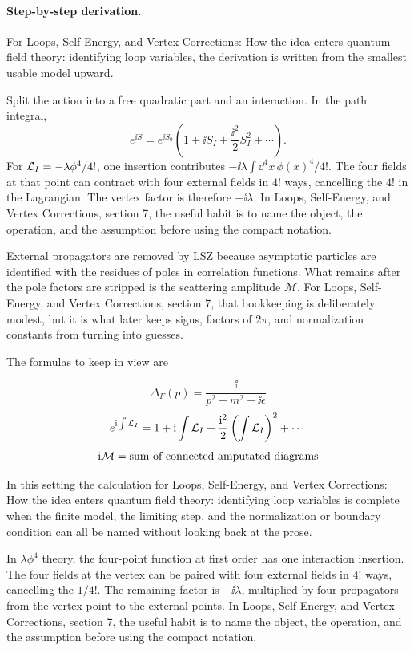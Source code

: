 \paragraph{Step-by-step derivation.}

For Loops, Self-Energy, and Vertex Corrections: How the idea enters quantum field theory: identifying loop variables, the derivation is written from the smallest usable model upward.

Split the action into a free quadratic part and an interaction.  In the path integral,
\[
  e^{\ii S}=e^{\ii S_0}\left(1+\ii S_I+\frac{\ii^2}{2}S_I^2+\cdots\right).
\]
For \(\mathcal L_I=-\lambda\phi^4/4!\), one insertion contributes \(-\ii\lambda\int\dd^4x\,\phi(x)^4/4!\).  The four fields at that point can contract with four external fields in \(4!\) ways, cancelling the \(4!\) in the Lagrangian.  The vertex factor is therefore \(-\ii\lambda\).  In Loops, Self-Energy, and Vertex Corrections, section 7, the useful habit is to name the object, the operation, and the assumption before using the compact notation.

External propagators are removed by LSZ because asymptotic particles are identified with the residues of poles in correlation functions.  What remains after the pole factors are stripped is the scattering amplitude \(\mathcal M\).  For Loops, Self-Energy, and Vertex Corrections, section 7, that bookkeeping is deliberately modest, but it is what later keeps signs, factors of \(2\pi\), and normalization constants from turning into guesses.

The formulas to keep in view are

\[
  \Delta_F(p)=\frac{\ii}{p^2-m^2+\ii\epsilon}
\]
\[
  e^{\mathrm i\int\mathcal L_I}=1+\mathrm i\int\mathcal L_I+\frac{\mathrm i^2}{2}\left(\int\mathcal L_I\right)^2+\cdots
\]
\[
  \mathrm i\mathcal M=\hbox{sum of connected amputated diagrams}
\]

In this setting the calculation for Loops, Self-Energy, and Vertex Corrections: How the idea enters quantum field theory: identifying loop variables is complete when the finite model, the limiting step, and the normalization or boundary condition can all be named without looking back at the prose.




\begin{example}
In \(\lambda\phi^4\) theory, the four-point function at first order has one interaction insertion.  The four fields at the vertex can be paired with four external fields in \(4!\) ways, cancelling the \(1/4!\).  The remaining factor is \(-\ii\lambda\), multiplied by four propagators from the vertex point to the external points.  In Loops, Self-Energy, and Vertex Corrections, section 7, the useful habit is to name the object, the operation, and the assumption before using the compact notation.
\end{example}



